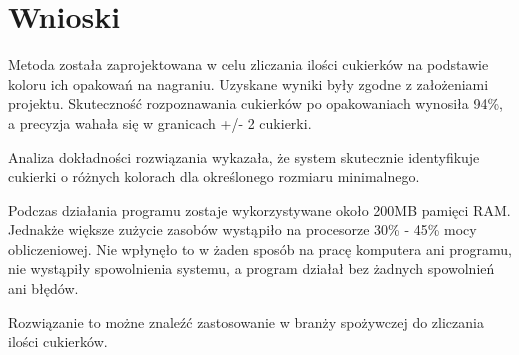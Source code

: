 \documentclass{article}
\begin{document}
\section{Wnioski}
\label{Wnioski}

Metoda została zaprojektowana w celu zliczania ilości cukierków na podstawie koloru ich opakowań na nagraniu. Uzyskane wyniki były zgodne z założeniami projektu. Skuteczność rozpoznawania cukierków po opakowaniach wynosiła 94\%, a precyzja wahała się w granicach +/- 2 cukierki.

Analiza dokładności rozwiązania wykazała, że system skutecznie identyfikuje cukierki o różnych kolorach dla określonego rozmiaru minimalnego.

Podczas działania programu zostaje wykorzystywane około 200MB pamięci RAM. Jednakże większe zużycie zasobów wystąpiło na procesorze 30\% - 45\% mocy obliczeniowej. Nie wpłynęło to w żaden sposób na pracę komputera ani programu, nie wystąpiły spowolnienia systemu, a program działał bez żadnych spowolnień ani błędów.

Rozwiązanie to możne znaleźć zastosowanie w branży spożywczej do zliczania ilości cukierków.
\end{document}

